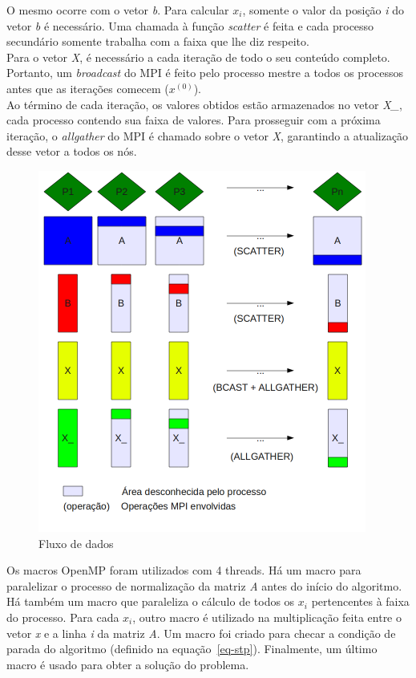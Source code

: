 \documentclass[a4paper]{article}
\begin{document}
\indent O mesmo ocorre com o vetor \emph{b}. Para calcular \begin{math}x_i\end{math}, somente o valor da posição \emph{i} do vetor \emph{b} é necessário. Uma chamada à função \emph{scatter} é feita e cada processo secundário somente trabalha com a faixa que lhe diz respeito.\\
\indent Para o vetor \emph{X}, é necessário a cada iteração de todo o seu conteúdo completo. Portanto, um \emph{broadcast} do MPI é feito pelo processo mestre a todos os processos antes que as iterações comecem (\begin{math}x^{(0)}\end{math}).\\
\indent Ao término de cada iteração, os valores obtidos estão armazenados no vetor \emph{X\_}, cada processo contendo sua faixa de valores. Para prosseguir com a próxima iteração, o \emph{allgather} do MPI é chamado sobre o vetor \emph{X}, garantindo a atualização desse vetor a todos os nós.\\
\begin{figure}[float=p]
	\centerline{\includegraphics[width=408px, height=450px]{data}}
	\caption{Fluxo de dados}
	\label{pic-data}
\end{figure}
\indent Os macros OpenMP foram utilizados com 4 threads. Há um macro para paralelizar o processo de normalização da matriz \emph{A} antes do início do algoritmo. Há também um macro que paraleliza o cálculo de todos os \begin{math}x_i\end{math} pertencentes à faixa do processo. Para cada \begin{math}x_i\end{math}, outro macro é utilizado na multiplicação feita entre o vetor \emph{x} e a linha \emph{i} da matriz \emph{A}. Um macro foi criado para checar a condição de parada do algoritmo (definido na equação~\ref{eq-stp}). Finalmente, um último macro é usado para obter a solução do problema.
\end{document}
